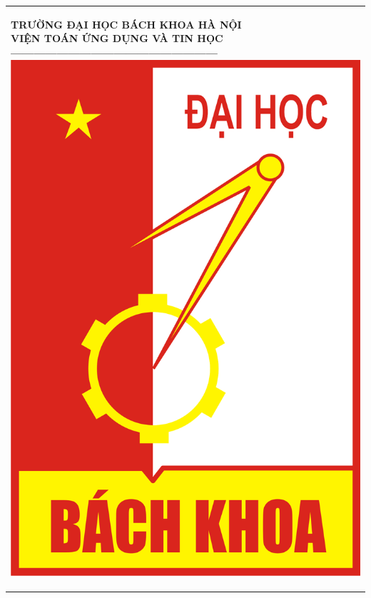 \documentclass[14pt]{extreport}
\begin{document}

 
\setlength{\parindent}{2em}
\setlength{\parskip}{1em}


\bgroup
\setlength{\parindent}{0px} 
\newcommand{\Khung}[2]{

\begin{tabular}{|l|}
\hline\rule[-2ex]{0pt}{5.5ex}
\parbox{#1}{#2}\\
\hline
\end{tabular}
}

\Khung{.92\textwidth}{

\begin{center}

\normalsize
\textbf{TRƯỜNG ĐẠI HỌC BÁCH KHOA HÀ NỘI}\\
\normalsize
\textbf{VIỆN TOÁN ỨNG DỤNG VÀ TIN HỌC}\\
\textbf{------------------------------------------------------}\\[0.4cm]
\includegraphics[scale=.2]{image/Logo_Hust.png}\\[1.2cm]


\end{center}}
\end{document}
